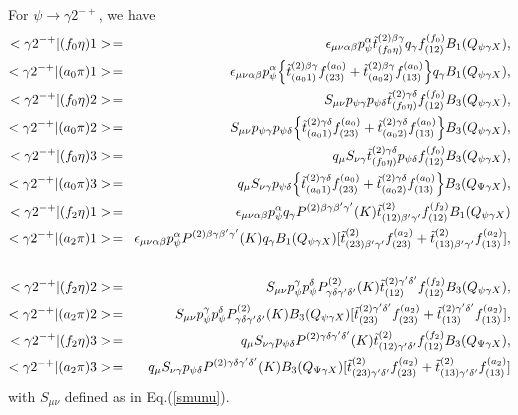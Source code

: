 For $\psi\to\gamma 2^{-+}$, we have
\begin{eqnarray}
<\gamma 2^{-+}|(f_0\eta)1> \!&=&\!
\epsilon_{\mu\nu\alpha\beta}p_\psi^{\alpha} \tilde
t_{(f_0\eta)}^{(2)\beta\gamma}q_\gamma
f_{(12)}^{(f_0)}B_1(Q_{\psi\gamma X}), \\
<\gamma 2^{-+}|(a_0\pi)1> \!&=&\!
\epsilon_{\mu\nu\alpha\beta}p_\psi^{\alpha} \Bigl\{\tilde
t_{(a_01)}^{(2)\beta\gamma}f_{(23)}^{(a_0)}+\tilde
t_{(a_02)}^{(2)\beta\gamma}f_{(13)}^{(a_0)}\Bigr\}
q_\gamma B_1(Q_{\psi\gamma X}), \\
<\gamma 2^{-+}|(f_0\eta)2> \!&=&\! S_{\mu\nu} p_{\psi\gamma}
p_{\psi\delta} \tilde t_{(f_0\eta)}^{(2)\gamma\delta}
f_{(12)}^{(f_0)}B_3(Q_{\psi\gamma X}), \\
<\gamma 2^{-+}|(a_0\pi)2> \!&=&\!  S_{\mu\nu} p_{\psi\gamma}
p_{\psi\delta} \Bigl\{\tilde
t_{(a_01)}^{(2)\gamma\delta}f_{(23)}^{(a_0)}+\tilde
t_{(a_02)}^{(2)\gamma\delta}f_{(13)}^{(a_0)}\Bigr\}
B_3(Q_{\psi\gamma X}), \\
<\gamma 2^{-+}|(f_0\eta)3> \!&=&\! q_\mu S_{\nu\gamma}
\tilde{t}^{(2)\gamma\delta}_{(f_0\eta)}p_{\psi\delta}
f_{(12)}^{(f_0)}B_3(Q_{\psi\gamma X}), \\
<\gamma 2^{-+}|(a_0\pi)3> \!&=&\! q_\mu S_{\nu\gamma}
p_{\psi\delta} \Bigl\{\tilde
t_{(a_01)}^{(2)\gamma\delta}f_{(23)}^{(a_0)}+\tilde
t_{(a_02)}^{(2)\gamma\delta}f_{(13)}^{(a_0)}\Bigr\}
B_3(Q_{\Psi\gamma X}), \\
<\gamma 2^{-+}|(f_2\eta)1> \!&=&\!
\epsilon_{\mu\nu\alpha\beta}p_\psi^{\alpha}q_\gamma
P^{(2)\beta\gamma\beta'\gamma'}(K)\tilde
t^{(2)}_{(12)\beta'\gamma'}
f_{(12)}^{(f_2)} B_1(Q_{\psi\gamma X})\\
<\gamma 2^{-+}|(a_2\pi)1> \!&=&\!
\epsilon_{\mu\nu\alpha\beta}p_\psi^{\alpha}
P^{(2)\beta\gamma\beta'\gamma'}(K)q_\gamma B_1(Q_{\psi\gamma X})
[\tilde t^{(2)}_{(23)\beta'\gamma'}f_{(23)}^{(a_2)}
+\tilde t^{(2)}_{(13)\beta'\gamma'}f_{(13)}^{(a_2)}],
\nonumber\\ & &\\
<\gamma 2^{-+}|(f_2\eta)2> \!&=&\! S_{\mu\nu} p_\psi^\gamma
p_\psi^\delta P^{(2)}_{\gamma\delta\gamma'\delta'}(K)\tilde
t_{(12)}^{(2)\gamma'\delta'}
f_{(12)}^{(f_2)}B_3(Q_{\psi\gamma X}), \\
<\gamma 2^{-+}|(a_2\pi)2> \!&=&\! S_{\mu\nu} p_\psi^\gamma
p_\psi^\delta P^{(2)}_{\gamma\delta\gamma'\delta'}(K)
B_3(Q_{\psi\gamma X})[\tilde t_{(23)}^{(2)\gamma'\delta'}
f_{(23)}^{(a_2)}
+\tilde t_{(13)}^{(2)\gamma'\delta'}f_{(13)}^{(a_2)}], \\
<\gamma 2^{-+}|(f_2\eta)3> \!&=&\! q_\mu S_{\nu\gamma}
p_{\psi\delta} P^{(2)\gamma\delta\gamma'\delta'}(K)\tilde
t^{(2)}_{(12)\gamma'\delta'}
f_{(12)}^{(f_2)}B_3(Q_{\Psi\gamma X}),\\
<\gamma 2^{-+}|(a_2\pi)3> \!&=&\! q_\mu S_{\nu\gamma}
p_{\psi\delta}P^{(2)\gamma\delta\gamma'\delta'}(K)
B_3(Q_{\Psi\gamma X}) [\tilde
t^{(2)}_{(23)\gamma'\delta'}f_{(23)}^{(a_2)} +\tilde
t^{(2)}_{(13)\gamma'\delta'}f_{(13)}^{(a_2)}]
\end{eqnarray}
with $S_{\mu\nu}$ defined as in Eq.(\ref{smunu}).

